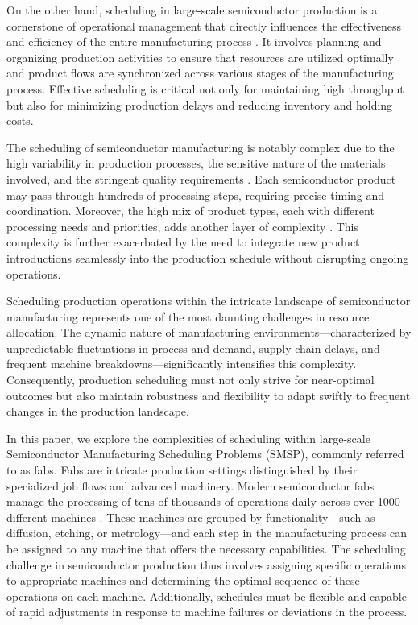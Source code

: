 \documentclass[runningheads]{llncs}
\begin{document}
On the other hand, scheduling in large-scale semiconductor production is a cornerstone of operational management that directly influences the effectiveness and efficiency of the entire manufacturing process \cite{schumann2022scheduling}. It involves planning and organizing production activities to ensure that resources are utilized optimally and product flows are synchronized across various stages of the manufacturing process. Effective scheduling is critical not only for maintaining high throughput but also for minimizing production delays and reducing inventory and holding costs.

The scheduling of semiconductor manufacturing is notably complex due to the high variability in production processes, the sensitive nature of the materials involved, and the stringent quality requirements \cite{May2006}. Each semiconductor product may pass through hundreds of processing steps, requiring precise timing and coordination. Moreover, the high mix of product types, each with different processing needs and priorities, adds another layer of complexity \cite{Mönch2011}. This complexity is further exacerbated by the need to integrate new product introductions seamlessly into the production schedule without disrupting ongoing operations.

Scheduling production operations within the intricate landscape of semiconductor manufacturing represents one of the most daunting challenges in resource allocation. The dynamic nature of manufacturing environments—characterized by unpredictable fluctuations in process and demand, supply chain delays, and frequent machine breakdowns—significantly intensifies this complexity. Consequently, production scheduling must not only strive for near-optimal outcomes but also maintain robustness and flexibility to adapt swiftly to frequent changes in the production landscape. 

In this paper, we explore the complexities of scheduling within large-scale Semiconductor Manufacturing Scheduling Problems (SMSP), commonly referred to as fabs. Fabs are intricate production settings distinguished by their specialized job flows and advanced machinery. Modern semiconductor fabs manage the processing of tens of thousands of operations daily across over 1000 different machines \cite{kopp2020smt2020}. These machines are grouped by functionality—such as diffusion, etching, or metrology—and each step in the manufacturing process can be assigned to any machine that offers the necessary capabilities. The scheduling challenge in semiconductor production thus involves assigning specific operations to appropriate machines and determining the optimal sequence of these operations on each machine. Additionally, schedules must be flexible and capable of rapid adjustments in response to machine failures or deviations in the process.
\end{document}
